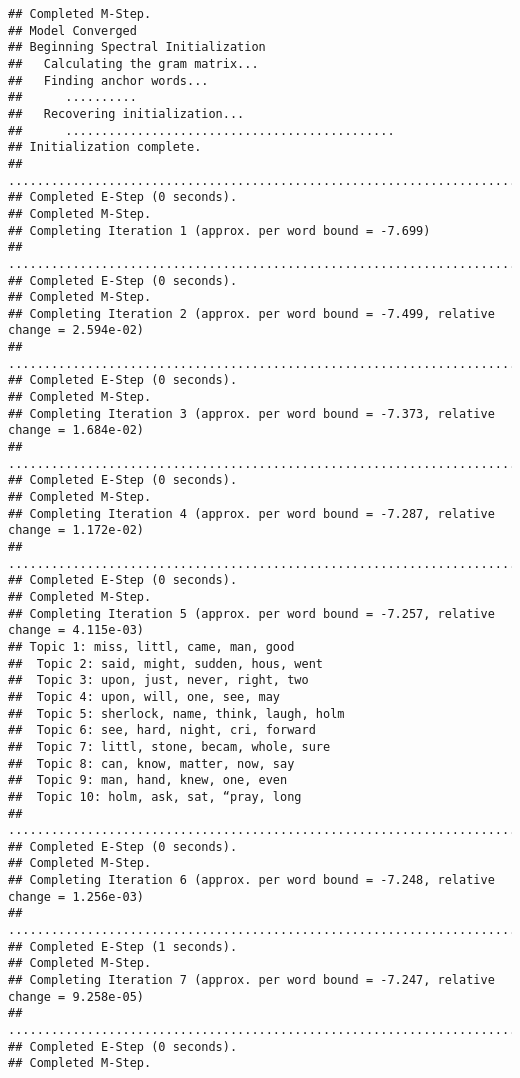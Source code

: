 \documentclass[
]{book}
\begin{document}
\begin{verbatim}
## Completed M-Step. 
## Model Converged 
## Beginning Spectral Initialization 
##   Calculating the gram matrix...
##   Finding anchor words...
##      ..........
##   Recovering initialization...
##      ..............................................
## Initialization complete.
## ....................................................................................................
## Completed E-Step (0 seconds). 
## Completed M-Step. 
## Completing Iteration 1 (approx. per word bound = -7.699) 
## ....................................................................................................
## Completed E-Step (0 seconds). 
## Completed M-Step. 
## Completing Iteration 2 (approx. per word bound = -7.499, relative change = 2.594e-02) 
## ....................................................................................................
## Completed E-Step (0 seconds). 
## Completed M-Step. 
## Completing Iteration 3 (approx. per word bound = -7.373, relative change = 1.684e-02) 
## ....................................................................................................
## Completed E-Step (0 seconds). 
## Completed M-Step. 
## Completing Iteration 4 (approx. per word bound = -7.287, relative change = 1.172e-02) 
## ....................................................................................................
## Completed E-Step (0 seconds). 
## Completed M-Step. 
## Completing Iteration 5 (approx. per word bound = -7.257, relative change = 4.115e-03) 
## Topic 1: miss, littl, came, man, good 
##  Topic 2: said, might, sudden, hous, went 
##  Topic 3: upon, just, never, right, two 
##  Topic 4: upon, will, one, see, may 
##  Topic 5: sherlock, name, think, laugh, holm 
##  Topic 6: see, hard, night, cri, forward 
##  Topic 7: littl, stone, becam, whole, sure 
##  Topic 8: can, know, matter, now, say 
##  Topic 9: man, hand, knew, one, even 
##  Topic 10: holm, ask, sat, “pray, long 
## ....................................................................................................
## Completed E-Step (0 seconds). 
## Completed M-Step. 
## Completing Iteration 6 (approx. per word bound = -7.248, relative change = 1.256e-03) 
## ....................................................................................................
## Completed E-Step (1 seconds). 
## Completed M-Step. 
## Completing Iteration 7 (approx. per word bound = -7.247, relative change = 9.258e-05) 
## ....................................................................................................
## Completed E-Step (0 seconds). 
## Completed M-Step. 

\end{verbatim}
\end{document}

